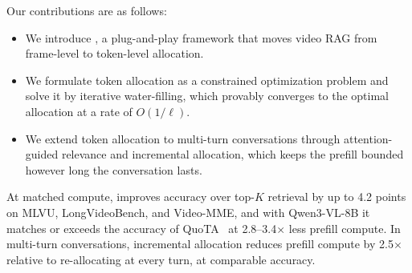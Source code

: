Our contributions are as follows:
\begin{itemize}
  \item We introduce \name, a plug-and-play framework that moves video RAG from frame-level to token-level allocation.
  \item We formulate token allocation as a constrained optimization problem and solve it by iterative water-filling, which provably converges to the optimal allocation at a rate of $O(1/\ell)$.
  \item We extend token allocation to multi-turn conversations through attention-guided relevance and incremental allocation, which keeps the prefill bounded however long the conversation lasts.
\end{itemize}
At matched compute, \name improves accuracy over top-$K$ retrieval by up to 4.2 points on MLVU, LongVideoBench, and Video-MME, and with Qwen3-VL-8B it matches or exceeds the accuracy of QuoTA~\cite{luo2025quota} at 2.8--3.4$\times$ less prefill compute. In multi-turn conversations, incremental allocation reduces prefill compute by 2.5$\times$ relative to re-allocating at every turn, at comparable accuracy.
